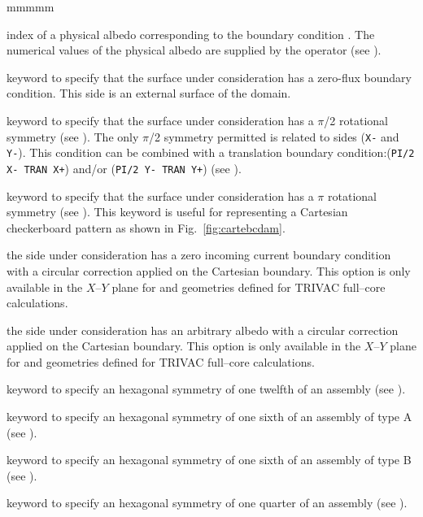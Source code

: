 \begin{ListeDeDescription}{mmmmm}
\item[\dusa{icode}] index of a physical albedo corresponding to the boundary
condition . The numerical values of the physical albedo are supplied
by the operator  (see ).

\item[\moc{ZERO}] keyword to specify that the surface under consideration has a
zero-flux boundary condition. This side is an external surface of the domain.

\item[\moc{PI/2}] keyword to specify that the surface under consideration has a
$\pi$/2 rotational symmetry (see ). The only $\pi$/2 symmetry permitted is related to
sides ({\tt X-} and {\tt Y-}). This condition can be combined with a translation
boundary condition:({\tt PI/2 X- TRAN X+}) and/or ({\tt PI/2 Y- TRAN Y+}) (see ).

\item[\moc{PI}] keyword to specify that the surface under consideration has a
$\pi$ rotational symmetry (see ). This keyword is useful for representing a
Cartesian checkerboard pattern as shown in Fig.~\ref{fig:cartebcdam}.

\item[\moc{CYLI}] the side under consideration has a zero incoming current boundary condition
with a circular correction applied on the Cartesian boundary. This option is only available in
the $X$--$Y$ plane for  and  geometries defined for TRIVAC full--core calculations.

\item[\moc{ACYL}] the side under consideration has an arbitrary albedo with a circular correction
applied on the Cartesian boundary. This option is only available in
the $X$--$Y$ plane for  and  geometries defined for TRIVAC full--core calculations.

\item[\moc{S30}] keyword to specify an hexagonal symmetry of one twelfth of an
assembly (see ).

\item[\moc{SA60}] keyword to specify an hexagonal symmetry of one sixth of an
assembly of type A (see ).

\item[\moc{SB60}] keyword to specify an hexagonal symmetry of one sixth of an
assembly of type B (see ).

\item[\moc{S90}] keyword to specify an hexagonal symmetry of one quarter of an
assembly (see ).


\end{ListeDeDescription}
